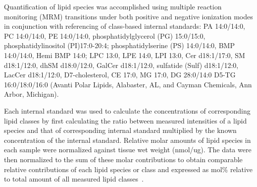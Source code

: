 \documentclass[letterpaper]{article}
\begin{document}
Quantification of lipid species was accomplished using multiple reaction
monitoring (MRM) transitions under both positive and negative ionization
modes in conjunction with referencing of class-based internal standards: PA
14:0/14:0, PC 14:0/14:0, PE 14:0/14:0, phosphatidylglycerol (PG) 15:0/15:0,
phosphatidylinositol (PI)17:0-20:4; phosphatidylserine (PS) 14:0/14:0, BMP
14:0/14:0, Hemi BMP 14:0; LPC 13:0,  LPE 14:0, LPI 13:0, Cer d18:1/17:0, SM
d18:1/12:0, dhSM d18:0/12:0, GalCer d18:1/12:0, sulfatide (Sulf) d18:1/12:0,
LacCer d18:1/12:0, D7-cholesterol, CE 17:0, MG 17:0, DG 28:0/14:0 D5-TG
16:0/18:0/16:0 (Avanti Polar Lipids, Alabaster, AL, and Cayman Chemicals,
Ann Arbor, Michigan). 

Each internal standard was used to calculate the concentrations of
corresponding lipid classes by first calculating the ratio between measured
intensities of a lipid species and that of corresponding internal standard
multiplied by the known concentration of the internal standard.  Relative
molar amounts of lipid species in each sample were normalized against tissue
wet weight (nmol/ug).  The data were then normalized to the sum of these molar
contributions to obtain comparable relative contributions of each lipid
species or class and expressed as mol\% relative to total amount of all
measured lipid classes~\citep{Chan2017,Guan2013}.
\end{document}
